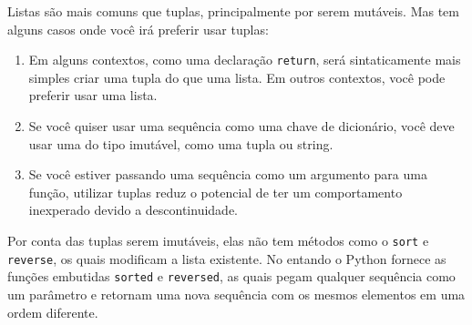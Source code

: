 Listas são mais comuns que tuplas, principalmente por serem mutáveis.
Mas tem alguns casos onde você irá preferir usar tuplas:

\begin{enumerate}

\item Em alguns contextos, como uma declaração {\tt return}, será
sintaticamente mais simples criar uma tupla do que uma lista. Em outros
contextos, você pode preferir usar uma lista.

\item Se você quiser usar uma sequência como uma chave de dicionário, você
deve usar uma do tipo imutável, como uma tupla ou string.

\item Se você estiver passando uma sequência como um argumento para uma função,
utilizar tuplas reduz o potencial de ter um comportamento inexperado devido a
descontinuidade.

\end{enumerate}

Por conta das tuplas serem imutáveis, elas não tem métodos como o {\tt sort}
e {\tt reverse}, os quais modificam a lista existente. No entando o Python
fornece as funções embutidas {\tt sorted} e {\tt reversed}, as quais pegam
qualquer sequência como um parâmetro e retornam uma nova sequência com os
mesmos elementos em uma ordem diferente.



